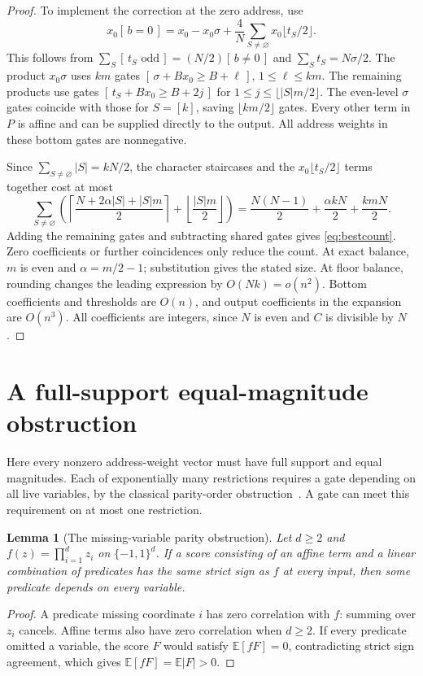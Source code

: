 \documentclass[11pt]{article}
\newtheorem{lemma}[theorem]{Lemma}
\newcommand{\ind}[1]{[\,#1\,]}
\begin{document}
\begin{proof}
To implement the correction at the zero address, use
$$
x_0\ind{b=0}=x_0-x_0\sigma+
 \frac4N\sum_{S\ne\varnothing}x_0\lfloor t_S/2\rfloor.
$$
This follows from $\sum_S\ind{t_S\text{ odd}}=(N/2)\ind{b\ne0}$
and $\sum_S t_S=N\sigma/2$. The product $x_0\sigma$ uses $km$ gates
$\ind{\sigma+Bx_0\ge B+\ell}$, $1\le\ell\le km$.
The remaining products use gates
$\ind{t_S+Bx_0\ge B+2j}$ for
$1\le j\le\lfloor |S|m/2\rfloor$.
The even-level $\sigma$ gates coincide with those for $S=[k]$, saving
$\lfloor km/2\rfloor$ gates. Every other term in $P$ is affine and
can be supplied directly to the output. All address weights in these
bottom gates are nonnegative.

Since $\sum_{S\ne\varnothing}|S|=kN/2$, the character staircases
and the $x_0\lfloor t_S/2\rfloor$ terms together cost at most
$$
\sum_{S\ne\varnothing}\left(
 \left\lceil\frac{N+2\alpha|S|+|S|m}{2}\right\rceil
 +\left\lfloor\frac{|S|m}{2}\right\rfloor\right)
 =\frac{N(N-1)}2+\frac{\alpha kN}2+\frac{kmN}2.
$$
Adding the remaining gates and subtracting shared gates gives
\eqref{eq:bestcount}. Zero coefficients or further coincidences only
reduce the count. At exact balance, $m$ is even and
$\alpha=m/2-1$; substitution gives the stated size. At floor balance,
rounding changes the leading expression by $O(Nk)=o(n^2)$.
Bottom coefficients and thresholds are $O(n)$, and output coefficients
in the expansion are $O(n^3)$. All coefficients are integers, since
$N$ is even and $C$ is divisible by $N$.
\end{proof}

\section{A full-support equal-magnitude obstruction}\label{sec:fullsign}
Here every nonzero address-weight vector must have full support and
equal magnitudes. Each of exponentially many restrictions requires a
gate depending on all live variables, by the classical parity-order
obstruction~\cite[Section~3.1]{MP}. A gate can meet this requirement
on at most one restriction.

\begin{lemma}[The missing-variable parity obstruction]\label{lem:paritydual}
Let $d\ge2$ and $f(z)=\prod_{i=1}^d z_i$ on $\{-1,1\}^d$.
If a score consisting of an affine term and a linear combination of
predicates has the same strict sign as $f$ at every input, then some
predicate depends on every variable.
\end{lemma}
\begin{proof}
A predicate missing coordinate $i$ has zero correlation with $f$:
summing over $z_i$ cancels. Affine terms also have zero correlation
when $d\ge2$. If every predicate omitted a variable, the score $F$
would satisfy $\mathbb E[fF]=0$, contradicting strict sign agreement,
which gives $\mathbb E[fF]=\mathbb E|F|>0$.
\end{proof}
\end{document}
